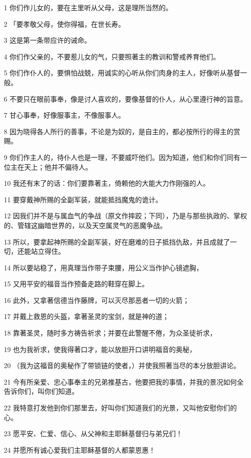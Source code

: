 \par 1 你们作儿女的，要在主里听从父母，这是理所当然的。
\par 2 「要孝敬父母，使你得福，在世长寿。
\par 3 这是第一条带应许的诫命。
\par 4 你们作父亲的，不要惹儿女的气，只要照著主的教训和警戒养育他们。
\par 5 你们作仆人的，要惧怕战兢，用诚实的心听从你们肉身的主人，好像听从基督一般。
\par 6 不要只在眼前事奉，像是讨人喜欢的，要像基督的仆人，从心里遵行神的旨意。
\par 7 甘心事奉，好像服事主，不像服事人。
\par 8 因为晓得各人所行的善事，不论是为奴的，是自主的，都必按所行的得主的赏赐。
\par 9 你们作主人的，待仆人也是一理，不要威吓他们。因为知道，他们和你们同有一位主在天上；他并不偏待人。
\par 10 我还有末了的话：你们要靠著主，倚赖他的大能大力作刚强的人。
\par 11 要穿戴神所赐的全副军装，就能抵挡魔鬼的诡计。
\par 12 因我们并不是与属血气的争战（原文作摔跤；下同），乃是与那些执政的、掌权的、管辖这幽暗世界的，以及天空属灵气的恶魔争战。
\par 13 所以，要拿起神所赐的全副军装，好在磨难的日子抵挡仇敌，并且成就了一切，还能站立得住。
\par 14 所以要站稳了，用真理当作带子束腰，用公义当作护心镜遮胸，
\par 15 又用平安的福音当作预备走路的鞋穿在脚上。
\par 16 此外，又拿著信德当作藤牌，可以灭尽那恶者一切的火箭；
\par 17 并戴上救恩的头盔，拿著圣灵的宝剑，就是神的道；
\par 18 靠著圣灵，随时多方祷告祈求；并要在此警醒不倦，为众圣徒祈求，
\par 19 也为我祈求，使我得著口才，能以放胆开口讲明福音的奥秘，
\par 20 （我为这福音的奥秘作了带锁链的使者，）并使我照著当尽的本分放胆讲论。
\par 21 今有所亲爱、忠心事奉主的兄弟推基古，他要把我的事情，并我的景况如何全告诉你们，叫你们知道。
\par 22 我特意打发他到你们那里去，好叫你们知道我们的光景，又叫他安慰你们的心。
\par 23 愿平安、仁爱、信心、从父神和主耶稣基督归与弟兄们！
\par 24 并愿所有诚心爱我们主耶稣基督的人都蒙恩惠！


